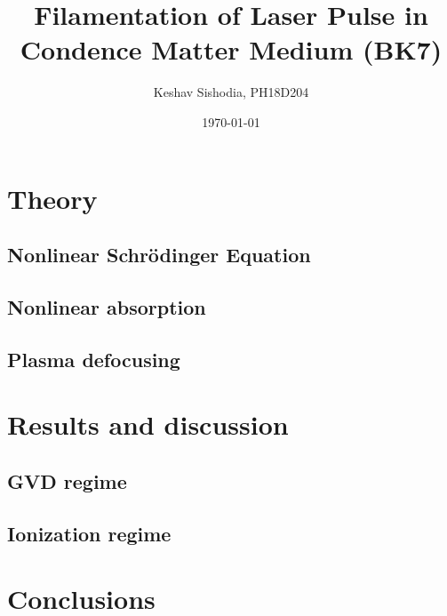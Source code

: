 \documentclass[aps,prl,twocolumn,groupedaddress]{revtex4-2}
\begin{document}
\title{Filamentation of Laser Pulse in Condence Matter Medium (BK7)}
\author{Keshav Sishodia, PH18D204}
\date{\today}

\begin{abstract}
	
\end{abstract}

\maketitle

\section{Theory}
	\subsection{Nonlinear Schrödinger Equation}
		
	\subsection{Nonlinear absorption}
		
	\subsection{Plasma defocusing}
		

\section{Results and discussion}
	
	\subsection{GVD regime}
		
	\subsection{Ionization regime}
		

\section{Conclusions}
	


\end{document}
